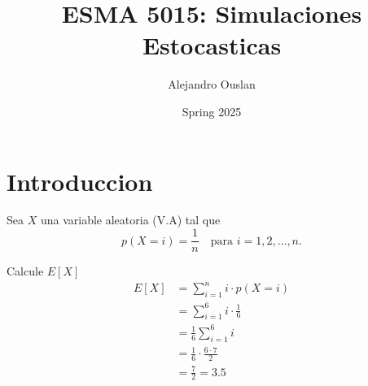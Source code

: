 \documentclass[10pt, oneside]{article}
\title{ESMA 5015: Simulaciones Estocasticas}
\author{Alejandro Ouslan}
\date{Spring 2025}
\begin{document}
\maketitle
\tableofcontents

\vspace{.25in}

\section{Introduccion}

Sea $X$ una variable aleatoria (V.A) tal que
$$ p(X = i) = \frac{1}{n} \quad \text{para } i = 1, 2, \ldots, n. $$

Calcule $E[X]$
\[
	\begin{split}
		E[X] & = \sum_{i=1}^{n} i \cdot p(X = i)       \\
		     & = \sum_{i=1}^{6} i \cdot \frac{1}{6}    \\
		     & = \frac{1}{6} \sum_{i=1}^{6} i          \\
		     & = \frac{1}{6} \cdot \frac{6 \cdot 7}{2} \\
		     & = \frac{7}{2} = 3.5
	\end{split}
\]
\end{document}
